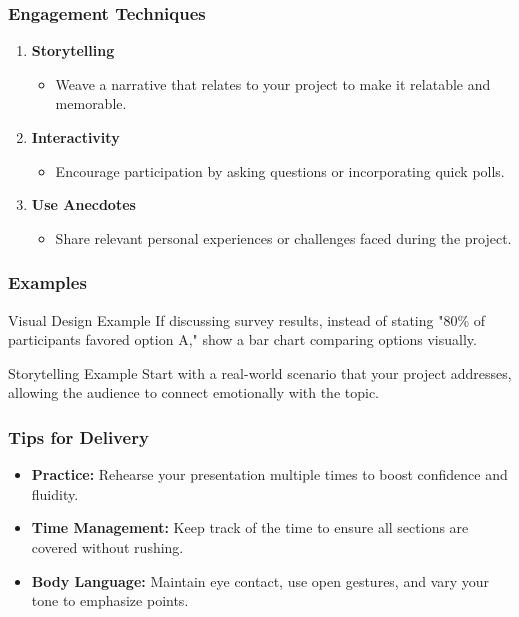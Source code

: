 \documentclass{beamer}
\begin{document}
\begin{frame}[fragile]
    \frametitle{Engagement Techniques}
    \begin{enumerate}
        \item \textbf{Storytelling}
            \begin{itemize}
                \item Weave a narrative that relates to your project to make it relatable and memorable.
            \end{itemize}
        
        \item \textbf{Interactivity}
            \begin{itemize}
                \item Encourage participation by asking questions or incorporating quick polls.
            \end{itemize}
        
        \item \textbf{Use Anecdotes}
            \begin{itemize}
                \item Share relevant personal experiences or challenges faced during the project.
            \end{itemize}
    \end{enumerate}
\end{frame}

\begin{frame}[fragile]
    \frametitle{Examples}
    \begin{block}{Visual Design Example}
        If discussing survey results, instead of stating "80\% of participants favored option A," show a bar chart comparing options visually.
    \end{block}
    
    \begin{block}{Storytelling Example}
        Start with a real-world scenario that your project addresses, allowing the audience to connect emotionally with the topic.
    \end{block}
\end{frame}

\begin{frame}[fragile]
    \frametitle{Tips for Delivery}
    \begin{itemize}
        \item \textbf{Practice:} Rehearse your presentation multiple times to boost confidence and fluidity.
        \item \textbf{Time Management:} Keep track of the time to ensure all sections are covered without rushing.
        \item \textbf{Body Language:} Maintain eye contact, use open gestures, and vary your tone to emphasize points.
    \end{itemize}
\end{frame}
\end{document}
